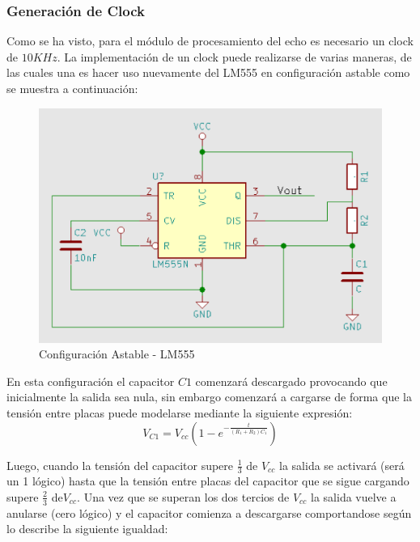 \subsubsection{Generación de Clock}

Como se ha visto, para el módulo de procesamiento del echo es necesario
un clock de $10KHz$. La implementación de un clock puede realizarse
de varias maneras, de las cuales una es hacer uso nuevamente del LM555
en configuración astable como se muestra a continuación:

\begin{figure}[H]
\begin{centering}
\includegraphics[scale=0.4]{astable555.PNG}
\par\end{centering}
\caption{Configuración Astable - LM555}
\end{figure}

En esta configuración el capacitor $C1$ comenzará descargado provocando
que inicialmente la salida sea nula, sin embargo comenzará a cargarse
de forma que la tensión entre placas puede modelarse mediante la siguiente
expresión: 
\begin{equation}
    V_{C1}=V_{cc}(1-e^{-\frac{t}{(R_{1}+R_{2})C_{1}}})   
\end{equation}


Luego, cuando la tensión del capacitor supere $\frac{1}{3}$ de $V_{cc}$
la salida se activará (será un 1 lógico) hasta que la tensión entre
placas del capacitor que se sigue cargando supere $\frac{2}{3}$ de$V_{cc}$.
Una vez que se superan los dos tercios de $V_{cc}$ la salida vuelve
a anularse (cero lógico) y el capacitor comienza a descargarse comportandose
según lo describe la siguiente igualdad:

